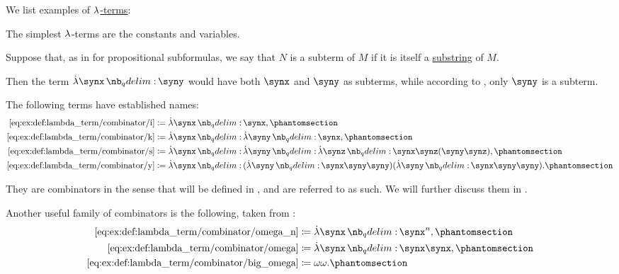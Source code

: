 \begin{example}\label{ex:def:lambda_term}
  We list examples of \hyperref[def:lambda_term]{\( {\mathrm \lambda} \)-terms}:
  \begin{thmenum}
     The simplest \( {\mathrm \lambda} \)-terms are the constants and variables.

     Suppose that, as in  for propositional subformulas, we say that \( N \) is a subterm of \( M \) if it is itself a \hyperref[def:formal_language/substring]{substring} of \( M \).

    Then the term \( \qabs \synx \syny \) would have both \( \synx \) and \( \syny \) as subterms, while according to , only \( \syny \) is a subterm.

     The following terms have established names:
    \begin{align*}
      \ref{eq:ex:def:lambda_term/combinator/i} &\coloneqq \qabs \synx \synx,                                                           \taglabel[\ensuremath{I}]{eq:ex:def:lambda_term/combinator/i} \\
      \ref{eq:ex:def:lambda_term/combinator/k} &\coloneqq \qabs \synx \qabs \syny \synx,                                               \taglabel[\ensuremath{K}]{eq:ex:def:lambda_term/combinator/k} \\
      \ref{eq:ex:def:lambda_term/combinator/s} &\coloneqq \qabs \synx \qabs \syny \qabs \synz \synx \synz (\syny \synz),               \taglabel[\ensuremath{S}]{eq:ex:def:lambda_term/combinator/s} \\
      \ref{eq:ex:def:lambda_term/combinator/y} &\coloneqq \qabs \synx (\qabs \syny \synx \syny \syny) (\qabs \syny \synx \syny \syny). \taglabel[\ensuremath{Y}]{eq:ex:def:lambda_term/combinator/y}
    \end{align*}

    They are combinators in the sense that will be defined in , and are referred to as such. We will further discuss them in .

    Another useful family of combinators is the following, taken from \cite[\S 3.1.21; \S 6.2.1]{Barendregt1984LambdaCalculus}:
    \begin{align*}
      \ref{eq:ex:def:lambda_term/combinator/omega_n}   &\coloneqq \qabs \synx \synx^n,     \taglabel[\ensuremath{ \omega_n }]{eq:ex:def:lambda_term/combinator/omega_n} \\
      \ref{eq:ex:def:lambda_term/combinator/omega}     &\coloneqq \qabs \synx \synx \synx, \taglabel[\ensuremath{ \omega }]{eq:ex:def:lambda_term/combinator/omega} \\
      \ref{eq:ex:def:lambda_term/combinator/big_omega} &\coloneqq \omega \omega.           \taglabel[\ensuremath{ \Omega }]{eq:ex:def:lambda_term/combinator/big_omega}
    \end{align*}
  \end{thmenum}
\end{example}

